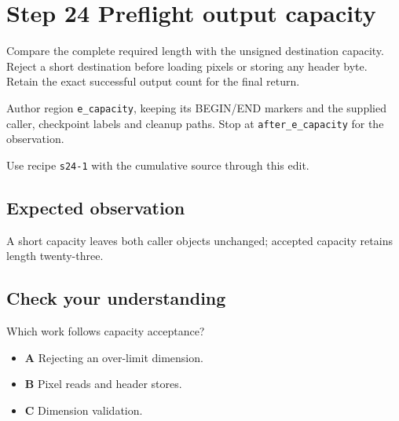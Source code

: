 \section{Step 24 Preflight output capacity}\label{ppm-s24}

Compare the complete required length with the unsigned destination capacity. Reject a short destination before loading pixels or storing any header byte. Retain the exact successful output count for the final return.

Author region \texttt{e\_capacity}, keeping its BEGIN/END markers and the supplied caller, checkpoint labels and cleanup paths. Stop at \texttt{after\_e\_capacity} for the observation.

Use recipe \texttt{s24-1} with the cumulative source through this edit.

\subsection{Expected observation}
A short capacity leaves both caller objects unchanged; accepted capacity retains length twenty-three.

\subsection{Check your understanding}
Which work follows capacity acceptance?

\begin{itemize}
  \item \textbf{A} Rejecting an over-limit dimension.
  \item \textbf{B} Pixel reads and header stores.
  \item \textbf{C} Dimension validation.
\end{itemize}
